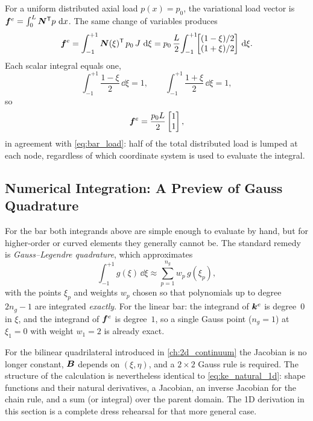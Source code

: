 For a uniform distributed axial load $p(x) = p_0$, the variational load
vector is $\bm{f}^e = \int_0^L \bm{N}^{\mathsf{T}} p \,\,\mathrm{d} x$. The same
change of variables produces
\begin{equation}
    \bm{f}^e
    = \int_{-1}^{+1} \bm{N}(\xi)^{\mathsf{T}}\, p_0\, J\,\,\mathrm{d}\xi
    = p_0\,\frac{L}{2}\!
      \int_{-1}^{+1}\!\!
      \begin{bmatrix} (1-\xi)/2 \\ (1+\xi)/2 \end{bmatrix}\,\mathrm{d}\xi .
\end{equation}
Each scalar integral equals one,
\[
    \int_{-1}^{+1}\frac{1-\xi}{2}\,\dd\xi = 1,
    \qquad
    \int_{-1}^{+1}\frac{1+\xi}{2}\,\dd\xi = 1,
\]
so
\begin{equation}
    \bm{f}^e = \frac{p_0 L}{2}\begin{bmatrix} 1 \\ 1 \end{bmatrix} ,
\end{equation}
in agreement with \cref{eq:bar_load}: half of the total distributed load
is lumped at each node, regardless of which coordinate system is used to
evaluate the integral.

\subsection{Numerical Integration: A Preview of Gauss Quadrature}
\label{sec:gauss_preview_1d}

For the bar both integrands above are simple enough to evaluate by hand,
but for higher-order or curved elements they generally cannot be. The
standard remedy is \emph{Gauss--Legendre quadrature}, which approximates
\begin{equation}
    \int_{-1}^{+1} g(\xi)\,\dd\xi \approx \sum_{p=1}^{n_g} w_p\,g(\xi_p),
\end{equation}
with the points $\xi_p$ and weights $w_p$ chosen so that polynomials up
to degree $2n_g - 1$ are integrated \emph{exactly}. For the linear bar:
the integrand of $\bm{k}^e$ is degree~$0$ in $\xi$, and the integrand of
$\bm{f}^e$ is degree~$1$, so a single Gauss point ($n_g = 1$) at
$\xi_1 = 0$ with weight $w_1 = 2$ is already exact.

For the bilinear quadrilateral introduced in \cref{ch:2d_continuum} the
Jacobian is no longer constant, $\bm{B}$ depends on $(\xi,\eta)$, and a
$2\times2$ Gauss rule is required. The structure of the calculation is
nevertheless identical to \cref{eq:ke_natural_1d}: shape functions and
their natural derivatives, a Jacobian, an inverse Jacobian for the
chain rule, and a sum (or integral) over the parent domain. The 1D
derivation in this section is a complete dress rehearsal for that more
general case.

